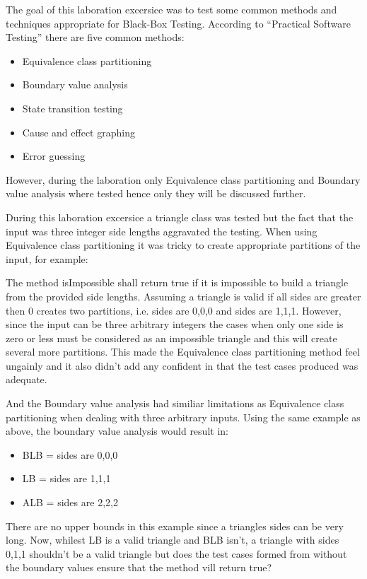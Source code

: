 The goal of this laboration excersice was to test some common methods and techniques appropriate for Black-Box Testing.
According to "`Practical Software Testing"' there are five common methods:
\begin{itemize}
	\item Equivalence class partitioning
	\item Boundary value analysis
	\item State transition testing
	\item Cause and effect graphing
	\item Error guessing
\end{itemize}

However, during the laboration only Equivalence class partitioning and Boundary value analysis where tested hence only they will be discussed further.

During this laboration excersice a triangle class was tested but the fact that the input was three integer side lengths aggravated the testing. 
When using Equivalence class partitioning it was tricky to create appropriate partitions of the input, for example:

The method isImpossible shall return true if it is impossible to build a triangle from the provided side lengths. 
Assuming a triangle is valid if all sides are greater then 0 creates two partitions, i.e. sides are 0,0,0 and sides are 1,1,1. 
However, since the input can be three arbitrary integers the cases when only one side is zero or less must be considered as an impossible triangle and this will create several more partitions.
This made the Equivalence class partitioning method feel ungainly and it also didn't add any confident in that the test cases produced was adequate.


And the Boundary value analysis had similiar limitations as Equivalence class partitioning when dealing with three arbitrary inputs. 
Using the same example as above, the boundary value analysis would result in:
\begin{itemize}
	\item BLB = sides are 0,0,0
	\item LB = sides are 1,1,1
	\item ALB = sides are 2,2,2
\end{itemize}
There are no upper bounds in this example since a triangles sides can be very long. 
Now, whilest LB is a valid triangle and BLB isn't, a triangle with sides 0,1,1 shouldn't be a valid triangle but does the test cases formed from without the boundary values ensure that the method vill return true?

